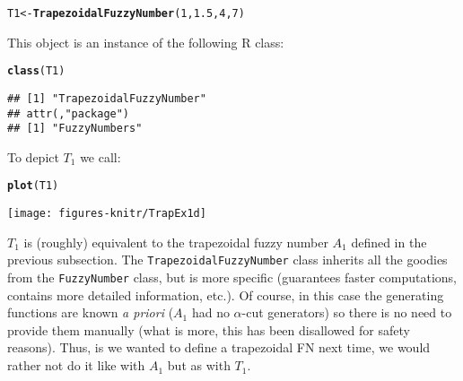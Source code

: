 \documentclass[11pt]{article}\usepackage{graphicx, color}
\makeatletter
\newcommand{\hlfunctioncall}[1]{\textcolor[rgb]{0.501960784313725,0,0.329411764705882}{\textbf{#1}}}%
\newenvironment{kframe}{%
 \def\at@end@of@kframe{}%
 \ifinner\ifhmode%
  \def\at@end@of@kframe{\end{minipage}}%
  \begin{minipage}{\columnwidth}%
 \fi\fi%
 \def\FrameCommand##1{\hskip\@totalleftmargin \hskip-\fboxsep
 \colorbox{shadecolor}{##1}\hskip-\fboxsep
     \hskip-\linewidth \hskip-\@totalleftmargin \hskip\columnwidth}%
 \MakeFramed {\advance\hsize-\width
   \@totalleftmargin\z@ \linewidth\hsize
   \@setminipage}}%
 {\par\unskip\endMakeFramed%
 \at@end@of@kframe}
\newenvironment{knitrout}{}{} %
\newcommand{\lang}[1]{\textsf{#1}\xspace}
\newcommand{\R}{\lang{R}}
\makeatother
\begin{document}
\begin{knitrout}\small
{}\color{fgcolor}\begin{kframe}
\begin{alltt}
T1 <- \hlfunctioncall{TrapezoidalFuzzyNumber}(1,1.5,4,7)
\end{alltt}
\end{kframe}
\end{knitrout}


\noindent
This object is an instance of the following \R class:

\begin{knitrout}\small
{}\color{fgcolor}\begin{kframe}
\begin{alltt}
\hlfunctioncall{class}(T1)
\end{alltt}
\begin{verbatim}
## [1] "TrapezoidalFuzzyNumber"
## attr(,"package")
## [1] "FuzzyNumbers"
\end{verbatim}
\end{kframe}
\end{knitrout}


\noindent
To depict $T_1$ we call:

\begin{knitrout}\small
{}\color{fgcolor}\begin{kframe}
\begin{alltt}
\hlfunctioncall{plot}(T1)
\end{alltt}
\end{kframe}
\end{knitrout}


\begin{center}
\begin{knitrout}\small
{}\color{fgcolor}

{\centering \texttt{[image: figures-knitr/TrapEx1d]} 

}



\end{knitrout}

\end{center}


\bigskip
$T_1$ is (roughly) equivalent to the trapezoidal fuzzy number $A_1$
defined in the previous subsection.
The \texttt{Trapezo\-idalFuzzyNumber}
class inherits all the goodies from the \texttt{FuzzyNumber} class,
but is more specific (guarantees faster computations,
contains more detailed information, etc.).
Of course, in this case the generating functions are known \textit{a priori}
($A_1$ had no $\alpha$-cut generators)
so there is no need to provide them manually
(what is more, this has been disallowed for safety reasons).
Thus, is we wanted to define a trapezoidal FN next time, we would rather
not do it like with $A_1$ but as with $T_1$.
\end{document}
